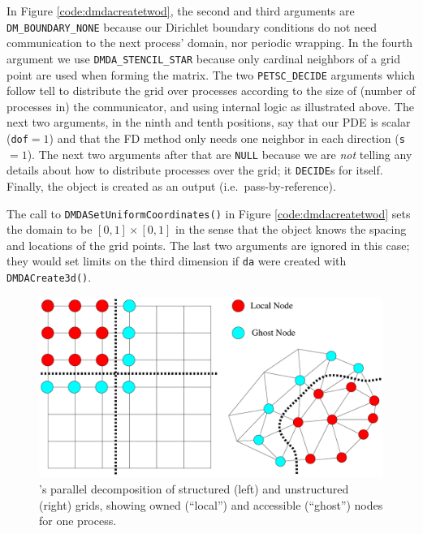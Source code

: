 In Figure \ref{code:dmdacreatetwod}, the second and third arguments are \texttt{DM\_BOUNDARY\_NONE} because our Dirichlet boundary conditions do not need communication to the next process' domain, nor periodic wrapping.  In the fourth argument we use \texttt{DMDA\_STENCIL\_STAR} because only cardinal neighbors of a grid point are used when forming the matrix.  The two \texttt{PETSC\_DECIDE} arguments which follow tell \PETSc to distribute the grid over processes according to the size of (number of processes in) the \MPI communicator, and using \PETSc internal logic as illustrated above.  The next two arguments, in the ninth and tenth positions, say that our PDE is scalar (\texttt{dof}$=1$) and that the FD method only needs one neighbor in each direction (\texttt{s}$=1$).  The next two arguments after that are \texttt{NULL} because we are \emph{not} telling \PETSc any details about how to distribute processes over the grid; it \texttt{DECIDE}s for itself.  Finally, the \pDMDA object is created as an output (i.e.~pass-by-reference).

The call to \texttt{DMDASetUniformCoordinates()} in Figure \ref{code:dmdacreatetwod} sets the domain to be $[0,1]\times[0,1]$ in the sense that the \pDM object knows the spacing and locations of the grid points.  The last two arguments are ignored in this case; they would set limits on the third dimension if \texttt{da} were created with \texttt{DMDACreate3d()}.

\medskip
\begin{figure}
\includegraphics[width=\textwidth]{petscghostvalues}
\caption{\PETSc's parallel decomposition of structured (left) and unstructured (right) grids, showing owned (``local'') and accessible (``ghost'') nodes for one process.}
\label{fig:petscghostvalues}
\end{figure}

